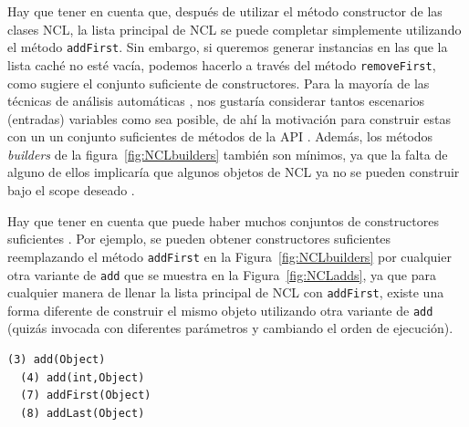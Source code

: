  Hay que tener en cuenta que, después de utilizar el método constructor de las clases NCL, la lista principal de NCL se puede completar simplemente utilizando el método
 \texttt{addFirst}. Sin embargo, si queremos generar instancias en las que la lista caché no esté vacía, podemos hacerlo a través del método
 \texttt{removeFirst}, como sugiere el conjunto suficiente de constructores.
 Para la mayoría de las técnicas de análisis automáticas , nos gustaría considerar tantos escenarios (entradas) variables como sea posible, de ahí la motivación para construir estas con un un conjunto suficientes de métodos de la API . Además, los métodos \emph{builders} de la figura~\ref{fig:NCLbuilders} también son mínimos, ya que la falta de alguno de ellos implicaría que algunos objetos de NCL ya no se pueden construir bajo el scope deseado .

Hay que tener en cuenta que puede haber muchos conjuntos de constructores suficientes . Por ejemplo, se pueden obtener constructores suficientes reemplazando el método \texttt{addFirst} en la Figura~\ref{fig:NCLbuilders} por cualquier otra variante de \texttt{add} que se muestra en la Figura~\ref{fig:NCLadds}, ya que para cualquier manera de llenar la lista principal de NCL con \texttt{addFirst}, existe una forma diferente de construir el mismo objeto utilizando otra variante de \texttt{add} (quizás invocada con diferentes parámetros y cambiando el orden de ejecución).
\\
\begin{lstlisting}[numbers=none,label=fig:NCLadds, caption=Variantes del método 'Add' que puedo ser utilizado para rellanar la lista principal en NCL, captionpos=b, frame=tb , basicstyle=\scriptsize]
  (3) add(Object)
  (4) add(int,Object)
  (7) addFirst(Object)
  (8) addLast(Object)
\end{lstlisting}



